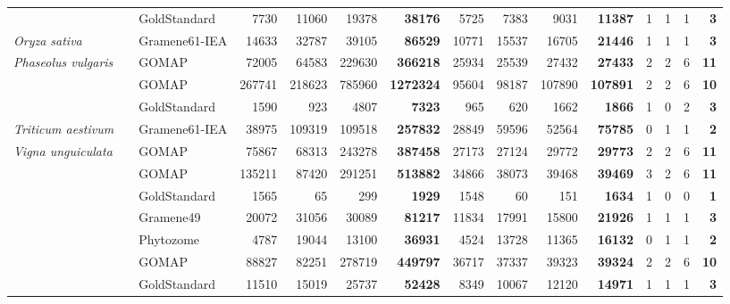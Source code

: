 \documentclass[utf8]{frontiersSCNS}
\begin{document}
\begin{table}[t]
{\begin{threeparttable}
\begin{tabular}{lrlrrr>{\bfseries}r|rrr>{\bfseries}r|rrr>{\bfseries}r}
\rowcolor{gray!6}   &  & GoldStandard & 7730 & 11060 & 19378 & 38176 & 5725 & 7383 & 9031 & 11387 & 1 & 1 & 1 & 3\\

\multirow{-3}{*}{\raggedright\arraybackslash \textit{Oryza sativa}} &  & Gramene61-IEA & 14633 & 32787 & 39105 & 86529 & 10771 & 15537 & 16705 & 21446 & 1 & 1 & 1 & 3\\

\rowcolor{gray!6}  \textit{Phaseolus vulgaris} &  & GOMAP & 72005 & 64583 & 229630 & 366218 & 25934 & 25539 & 27432 & 27433 & 2 & 2 & 6 & 11\\

 &  & GOMAP & 267741 & 218623 & 785960 & 1272324 & 95604 & 98187 & 107890 & 107891 & 2 & 2 & 6 & 10\\

\rowcolor{gray!6}   &  & GoldStandard & 1590 & 923 & 4807 & 7323 & 965 & 620 & 1662 & 1866 & 1 & 0 & 2 & 3\\

\multirow{-3}{*}{\raggedright\arraybackslash \textit{Triticum aestivum}} &  & Gramene61-IEA & 38975 & 109319 & 109518 & 257832 & 28849 & 59596 & 52564 & 75785 & 0 & 1 & 1 & 2\\

\rowcolor{gray!6}  \textit{Vigna unguiculata} &  & GOMAP & 75867 & 68313 & 243278 & 387458 & 27173 & 27124 & 29772 & 29773 & 2 & 2 & 6 & 11\\

 &  & GOMAP & 135211 & 87420 & 291251 & 513882 & 34866 & 38073 & 39468 & 39469 & 3 & 2 & 6 & 11\\

\rowcolor{gray!6}   &  & GoldStandard & 1565 & 65 & 299 & 1929 & 1548 & 60 & 151 & 1634 & 1 & 0 & 0 & 1\\

 &  & Gramene49 & 20072 & 31056 & 30089 & 81217 & 11834 & 17991 & 15800 & 21926 & 1 & 1 & 1 & 3\\

\rowcolor{gray!6}  \multirow{-4}{*}{\raggedright\arraybackslash \textit{Zea mays} B73.v3} &  & Phytozome & 4787 & 19044 & 13100 & 36931 & 4524 & 13728 & 11365 & 16132 & 0 & 1 & 1 & 2\\

 &  & GOMAP & 88827 & 82251 & 278719 & 449797 & 36717 & 37337 & 39323 & 39324 & 2 & 2 & 6 & 10\\

\rowcolor{gray!6}   &  & GoldStandard & 11510 & 15019 & 25737 & 52428 & 8349 & 10067 & 12120 & 14971 & 1 & 1 & 1 & 3\\


\end{tabular}
\end{threeparttable}}
\end{table}
\end{document}
